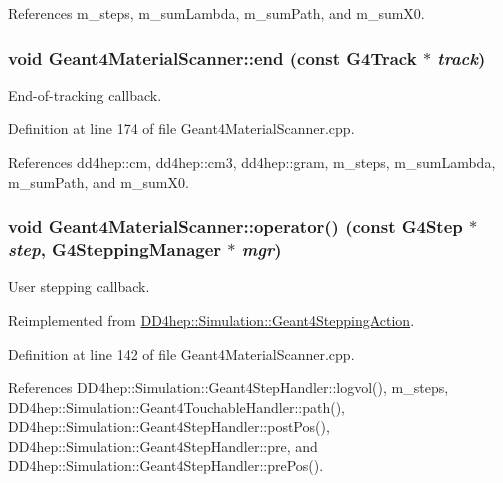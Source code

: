 References m\_\-steps, m\_\-sumLambda, m\_\-sumPath, and m\_\-sumX0.\hypertarget{class_d_d4hep_1_1_simulation_1_1_geant4_material_scanner_a08dd7d2ac6bece93af5709c1c2edc64c}{
\subsubsection[{end}]{\setlength{\rightskip}{0pt plus 5cm}void Geant4MaterialScanner::end (const G4Track $\ast$ {\em track})}}
\label{class_d_d4hep_1_1_simulation_1_1_geant4_material_scanner_a08dd7d2ac6bece93af5709c1c2edc64c}


End-\/of-\/tracking callback. 

Definition at line 174 of file Geant4MaterialScanner.cpp.

References dd4hep::cm, dd4hep::cm3, dd4hep::gram, m\_\-steps, m\_\-sumLambda, m\_\-sumPath, and m\_\-sumX0.\hypertarget{class_d_d4hep_1_1_simulation_1_1_geant4_material_scanner_abd897a6b73a1855f674962d0e6126c17}{
\subsubsection[{operator()}]{\setlength{\rightskip}{0pt plus 5cm}void Geant4MaterialScanner::operator() (const G4Step $\ast$ {\em step}, \/  G4SteppingManager $\ast$ {\em mgr})}}
\label{class_d_d4hep_1_1_simulation_1_1_geant4_material_scanner_abd897a6b73a1855f674962d0e6126c17}


User stepping callback. 

Reimplemented from \hyperlink{class_d_d4hep_1_1_simulation_1_1_geant4_stepping_action_ab6b61f6eaed6d06ddb3a7ed319258317}{DD4hep::Simulation::Geant4SteppingAction}.

Definition at line 142 of file Geant4MaterialScanner.cpp.

References DD4hep::Simulation::Geant4StepHandler::logvol(), m\_\-steps, DD4hep::Simulation::Geant4TouchableHandler::path(), DD4hep::Simulation::Geant4StepHandler::postPos(), DD4hep::Simulation::Geant4StepHandler::pre, and DD4hep::Simulation::Geant4StepHandler::prePos().

